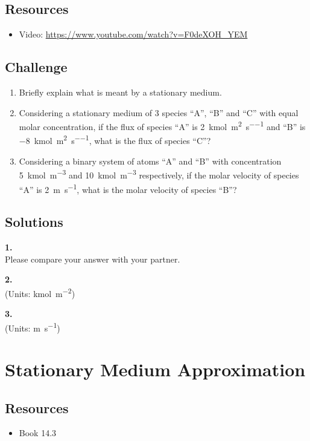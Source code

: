 \subsection*{Resources}
\begin{itemize}
    \item Video: \url{https://www.youtube.com/watch?v=F0deXOH_YEM}
\end{itemize}

\subsection*{Challenge}
\begin{enumerate}
    \item Briefly explain what is meant by a stationary medium.
    \item Considering a stationary medium of 3 species ``A'', ``B'' and ``C'' with equal molar concentration, if the flux of species ``A'' is \SI{2}{\kmol\per\square\meter\per\second} and ``B'' is \SI{-8}{\kmol\per\square\meter\per\second}, what is the flux of species ``C''?
    \item Considering a binary system of atoms ``A'' and ``B'' with concentration \SI{5}{\kmol\per\cubic\meter} and \SI{10}{\kmol\per\cubic\meter} respectively, if the molar velocity of species ``A'' is \SI{2}{\meter\per\second}, what is the molar velocity of species ``B''?
\end{enumerate}



\subsection*{Solutions}
\textbf{1.}\\
Please compare your answer with your partner.

\textbf{2.}\\
(Units: \si{\kmol\per\square\meter})\\

\textbf{3.}\\
(Units: \si{\meter\per\second})\\




\newpage
\section{Stationary Medium Approximation}

\subsection*{Resources}
\begin{itemize}
    \item Book 14.3
\end{itemize}

